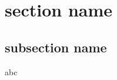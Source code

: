 \documentclass{beamer}
\begin{document}
\section{section name}
\subsection{subsection name}

\begin{frame}
    abc
\end{frame} 
\end{document}
